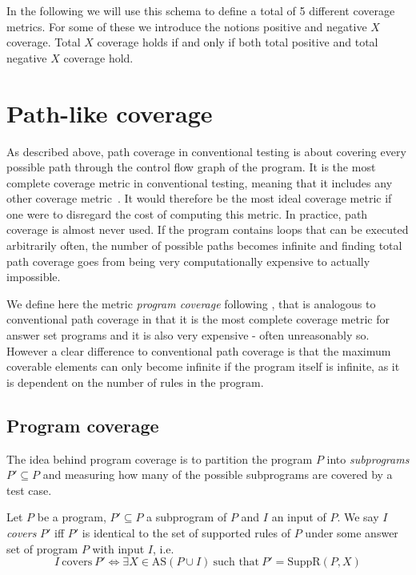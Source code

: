 In the following we will use this schema to define a total of 5 different coverage metrics. For some of these we introduce the notions positive and negative $X$ coverage. Total $X$ coverage holds if and only if both total positive and total negative $X$ coverage hold.

\section{Path-like coverage}
\label{sec:Coverage metrics/Path-like coverage}
As described above, path coverage in conventional testing is about covering every possible path through the control flow graph of the program. It is the most complete coverage metric in conventional testing, meaning that it includes any other coverage metric~\cite{Nta88}. It would therefore be the most ideal coverage metric if one were to disregard the cost of computing this metric. In practice, path coverage is almost never used. If the program contains loops that can be executed arbitrarily often, the number of possible paths becomes infinite and finding total path coverage goes from being very computationally expensive to actually impossible. 

We define here the metric \emph{program coverage} following \textcite{Jan+10}, that is analogous to conventional path coverage in that it is the most complete coverage metric for answer set programs and it is also very expensive - often unreasonably so. However a clear difference to conventional path coverage is that the maximum coverable elements can only become infinite if the program itself is infinite, as it is dependent on the number of rules in the program.


\subsection{Program coverage}
\label{subsec:Coverage metrics/Path-like coverage/Program coverage}
The idea behind program coverage is to partition the program $P$ into \emph{subprograms} \(P' \subseteq P\) and measuring how many of the possible subprograms are covered by a test case.

\begin{definition}
\label{def:program coverage}
    Let $P$ be a program, \(P' \subseteq P\) a subprogram of $P$ and $I$ an input of $P$. We say $I$ \emph{covers} $P'$ iff $P'$ is identical to the set of supported rules of $P$ under some answer set of program $P$ with input $I$, i.e. 
    \[
        I\ \text{covers}\ P' \Longleftrightarrow \exists X \in \text{AS}(P \cup I)\ \text{such that}\ P' = \text{SuppR}(P, X)
    \]
\end{definition}

